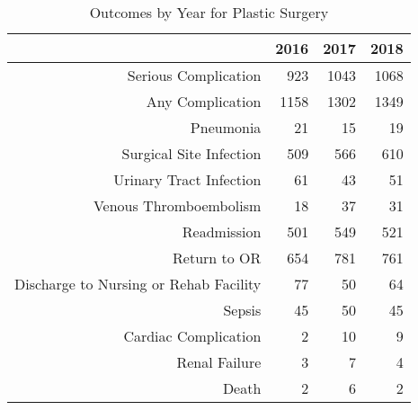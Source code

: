 \begin{table}[ht]
\centering
\begin{tabular}{rrrr}
  \hline
 & 2016 & 2017 & 2018 \\ 
  \hline
Serious Complication & 923 & 1043 & 1068 \\ 
  Any Complication & 1158 & 1302 & 1349 \\ 
  Pneumonia &  21 &  15 &  19 \\ 
  Surgical Site Infection & 509 & 566 & 610 \\ 
  Urinary Tract Infection &  61 &  43 &  51 \\ 
  Venous Thromboembolism &  18 &  37 &  31 \\ 
  Readmission & 501 & 549 & 521 \\ 
  Return to OR & 654 & 781 & 761 \\ 
  Discharge to Nursing or Rehab Facility &  77 &  50 &  64 \\ 
  Sepsis &  45 &  50 &  45 \\ 
  Cardiac Complication &   2 &  10 &   9 \\ 
  Renal Failure &   3 &   7 &   4 \\ 
  Death &   2 &   6 &   2 \\ 
   \hline
\end{tabular}
\caption{Outcomes by Year for Plastic Surgery} 
\end{table}

